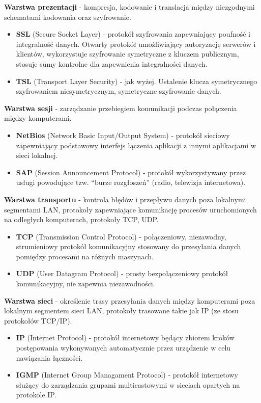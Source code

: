 \documentclass[main.tex]{subfiles}
\begin{document}
    \noindent \textbf{Warstwa prezentacji} - kompresja, kodowanie i
    translacja między niezgodnymi schematami kodowania oraz szyfrowanie.
    \begin{itemize}
        \item \textbf{SSL} (Secure Socket Layer) - protokół szyfrowania zapewniający poufność i integralność danych.
        Otwarty protokół umożliwiający autoryzację serwerów i klientów, wykorzystuje szyfrowanie symetryczne
        z kluczem publicznym, stosuje sumy kontrolne dla zapewnienia integralności danych.
        \item \textbf{TSL} (Transport Layer Security) - jak wyżej. Ustalenie klucza symetrycznego szyfrowaniem niesymetrycznym,
        symetryczne szyfrowanie danych.
    \end{itemize}

    \noindent \textbf{Warstwa sesji} - zarządzanie przebiegiem komunikacji podczas
    połączenia między komputerami.
    \begin{itemize}
        \item \textbf{NetBios} (Network Basic Input/Output System) - protokół sieciowy zapewniający podstawowy interfejs
        łączenia aplikacji z innymi aplikacjami w sieci lokalnej.
        \item \textbf{SAP} (Session Announcement Protocol) - protokół wykorzystywany przez usługi powodujące tzw.
        ``burze rozgłoszeń'' (radio, telewizja internetowa).
    \end{itemize}

    \noindent \textbf{Warstwa transportu} - kontrola błędów i przepływu danych
    poza lokalnymi segmentami LAN, protokoły zapewniające
    komunikację procesów uruchomionych na odległych komputerach, protokoły TCP, UDP.
    \begin{itemize}
        \item \textbf{TCP} (Transmission Control Protocol) - połączeniowy, niezawodny, strumieniowy protokół komunikacyjny
        stosowany do przesyłania danych pomiędzy procesami na różnych maszynach.
        \item \textbf{UDP} (User Datagram Protocol) - prosty bezpołączeniowy protokół komunikacyjny, nie zapewnia
        niezawodności.
    \end{itemize}

    \noindent \textbf{Warstwa sieci} - określenie trasy przesyłania
    danych między komputerami poza lokalnym segmentem sieci LAN, protokoły trasowane takie jak IP (ze stosu protokołów TCP/IP).
    \begin{itemize}
        \item \textbf{IP} (Internet Protocol) - protokół internetowy będący zbiorem kroków
        postępowania wykonywanych automatycznie przez urządzenie w celu nawiązania łączności.
        \item \textbf{IGMP} (Internet Group Managament Protocol) - protokół internetowy służący do zarządzania
        grupami multicastowymi w sieciach opartych na protokole IP.
    \end{itemize}
\end{document}
